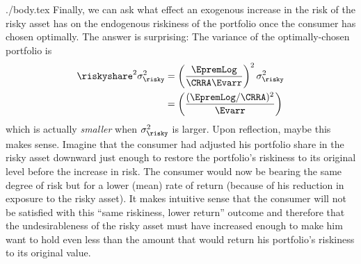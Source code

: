 \documentclass{\handout}
\begin{document}
\begin{verbatimwrite}{./body.tex}
Finally, we can ask what effect an exogenous increase in the risk of the 
risky asset has on the endogenous riskiness of the portfolio once the consumer
has chosen optimally.  The answer is surprising: The variance of the optimally-chosen
portfolio is 
\begin{equation}\begin{gathered}\begin{aligned}
\riskyshare^{2} \sigma^{2}_{\risky} & =  \left(\frac{\EpremLog}{\CRRA \Evarr}\right)^{2} \sigma^{2}_{\risky}
\\ & =  \left(\frac{(\EpremLog/\CRRA)^{2}}{\Evarr}\right)
\end{aligned}\end{gathered}\end{equation}
which is actually {\it smaller} when $\sigma^{2}_{\risky}$ is larger.  Upon reflection, maybe this makes sense.  Imagine that the consumer had adjusted his portfolio share in the risky asset downward just enough to restore the portfolio's riskiness to its original level before the increase in risk.  The consumer would now be bearing the same degree of risk but for a lower (mean) rate of return (because of his reduction in exposure to the risky asset).  It makes intuitive sense that the consumer will not be satisfied with this ``same riskiness, lower return'' outcome and therefore that the undesirableness of the risky asset must have increased enough to make him want to hold even less than the amount that would return his portfolio's riskiness to its original value.


\end{verbatimwrite}
\end{document}
